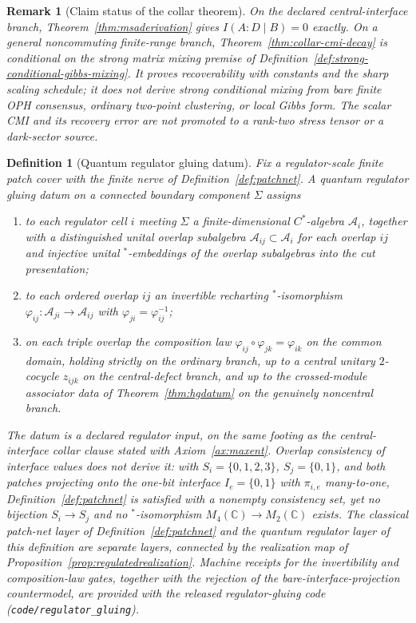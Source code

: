 \documentclass[11pt]{article}
\newtheorem{definition}[theorem]{Definition}
\newtheorem{remark}[theorem]{Remark}
\begin{document}
\begin{remark}[Claim status of the collar theorem]\label{rem:collar-cmi-claim-status}
On the declared central-interface branch, Theorem~\ref{thm:msaderivation} gives
\(I(A:D\mid B)=0\) exactly. On a general noncommuting finite-range branch,
Theorem~\ref{thm:collar-cmi-decay} is conditional on the strong matrix mixing premise of
Definition~\ref{def:strong-conditional-gibbs-mixing}. It proves recoverability with constants and
the sharp scaling schedule; it does not derive strong conditional mixing from bare finite OPH
consensus, ordinary two-point clustering, or local Gibbs form. The scalar CMI and its recovery
error are not promoted to a rank-two stress tensor or a dark-sector source.
\end{remark}

\begin{definition}[Quantum regulator gluing datum]\label{def:qregdatum}
Fix a regulator-scale finite patch cover with the finite nerve of Definition~\ref{def:patchnet}. A \emph{quantum regulator gluing datum} on a connected boundary component \(\Sigma\) assigns
\begin{enumerate}[leftmargin=2em]
\item to each regulator cell \(i\) meeting \(\Sigma\) a finite-dimensional \(C^*\)-algebra \(\mathcal A_i\), together with a distinguished unital overlap subalgebra \(\mathcal A_{ij}\subset\mathcal A_i\) for each overlap \(ij\) and injective unital \(^*\)-embeddings of the overlap subalgebras into the cut presentation;
\item to each ordered overlap \(ij\) an invertible recharting \(^*\)-isomorphism
\(\varphi_{ij}:\mathcal A_{ji}\to\mathcal A_{ij}\) with \(\varphi_{ji}=\varphi_{ij}^{-1}\);
\item on each triple overlap the composition law \(\varphi_{ij}\circ\varphi_{jk}=\varphi_{ik}\) on the common domain, holding strictly on the ordinary branch, up to a central unitary \(2\)-cocycle \(z_{ijk}\) on the central-defect branch, and up to the crossed-module associator data of Theorem~\ref{thm:hgdatum} on the genuinely noncentral branch.
\end{enumerate}
The datum is a declared regulator input, on the same footing as the central-interface collar clause stated with Axiom~\ref{ax:maxent}. Overlap consistency of interface values does not derive it: with \(S_i=\{0,1,2,3\}\), \(S_j=\{0,1\}\), and both patches projecting onto the one-bit interface \(I_e=\{0,1\}\) with \(\pi_{i,e}\) many-to-one, Definition~\ref{def:patchnet} is satisfied with a nonempty consistency set, yet no bijection \(S_i\to S_j\) and no \(^*\)-isomorphism \(M_4(\mathbb C)\to M_2(\mathbb C)\) exists. The classical patch-net layer of Definition~\ref{def:patchnet} and the quantum regulator layer of this definition are separate layers, connected by the realization map of Proposition~\ref{prop:regulatedrealization}. Machine receipts for the invertibility and composition-law gates, together with the rejection of the bare-interface-projection countermodel, are provided with the released regulator-gluing code (\texttt{code/regulator\_gluing}).
\end{definition}
\end{document}
